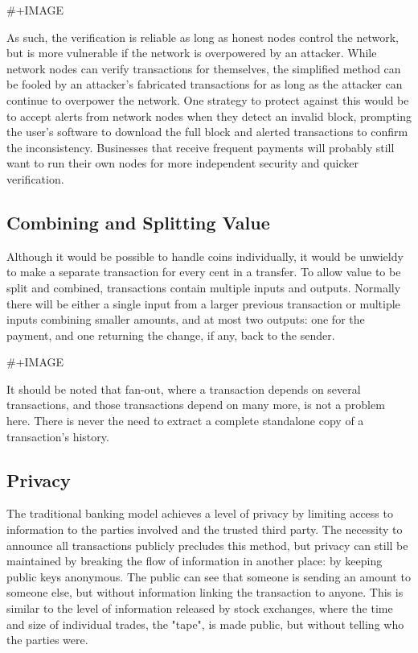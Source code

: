 \documentclass[11pt]{article}
\begin{document}
\#+IMAGE

As such, the verification is reliable as long as honest nodes control the network, but is more vulnerable if the network is overpowered by an attacker.
While network nodes can verify transactions for themselves, the simplified method can be fooled by an attacker's fabricated transactions for as long as the attacker can continue to overpower the network.
One strategy to protect against this would be to accept alerts from network nodes when they detect an invalid block, prompting the user's software to download the full block and alerted transactions to confirm the inconsistency.
Businesses that receive frequent payments will probably still want to run their own nodes for more independent security and quicker verification.

\subsection{Combining and Splitting Value}
\label{sec:org7377627}
Although it would be possible to handle coins individually, it would be unwieldy to make a separate transaction for every cent in a transfer.
To allow value to be split and combined, transactions contain multiple inputs and outputs.
Normally there will be either a single input from a larger previous transaction or multiple inputs combining smaller amounts, and at most two outputs: one for the payment, and one returning the change, if any, back to the sender.

\#+IMAGE

It should be noted that fan-out, where a transaction depends on several transactions, and those transactions depend on many more, is not a problem here.
There is never the need to extract a complete standalone copy of a transaction's history.

\subsection{Privacy}
\label{sec:org90669b9}
The traditional banking model achieves a level of privacy by limiting access to information to the parties involved and the trusted third party.
The necessity to announce all transactions publicly precludes this method, but privacy can still be maintained by breaking the flow of information in another place: by keeping public keys anonymous.
The public can see that someone is sending an amount to someone else, but without information linking the transaction to anyone.
This is similar to the level of information released by stock exchanges, where the time and size of individual trades, the "tape", is made public, but without telling who the parties were.
\end{document}
